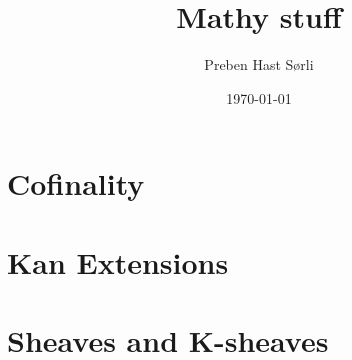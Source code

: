 \documentclass[british,titlepage]{ntnuthesis}
\title{Mathy stuff}
\author{Preben Hast Sørli}
\date{\today}
\begin{document}
\tableofcontents


\chapter{Cofinality}

\chapter{Kan Extensions}

\chapter{Sheaves and K-sheaves}

\printbibliography
\end{document}
